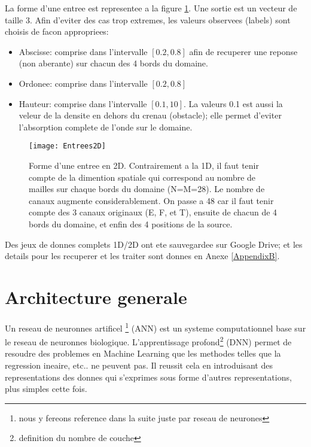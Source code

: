 La forme d'une entree est representee a la figure \ref{fig:Entrees2D}. Une sortie est un vecteur de taille 3. Afin d'eviter des cas trop extremes, les valeurs observees (labels) sont choisis de facon appropriees:
\begin{itemize}
 \item Abscisse: comprise dans l'intervalle $[0.2,0.8]$ afin de recuperer une reponse (non aberante) sur chacun des 4 bords du domaine.
 \item Ordonee: comprise dans l'intervalle $[0.2,0.8]$
 \item Hauteur: comprise dans l'intervalle $[0.1,10]$. La valeurs 0.1 est aussi la veleur de la densite en dehors du crenau (obstacle); elle permet d'eviter l'absorption complete de l'onde sur le domaine.
\end{itemize}

\begin{figure}[!h]
\centering
\texttt{[image: Entrees2D]} 
\decoRule
\caption[Entrees2D]{Forme d'une entree en 2D. Contrairement a la 1D, il faut tenir compte de la dimention spatiale qui correspond au nombre de mailles sur chaque bords du domaine (N=M=28). Le nombre de canaux augmente considerablement. On passe a 48 car il faut tenir compte des 3 canaux originaux (E, F, et T), ensuite de chacun de 4 bords du domaine, et enfin des 4 positions de la source.}
\label{fig:Entrees2D}
\end{figure}

Des jeux de donnes complets 1D/2D ont ete sauvegardee sur Google Drive; et les details pour les recuperer et les traiter sont donnes en Anexe \ref{AppendixB}.


\section{Architecture generale}

Un reseau de neuronnes artificel \footnote{nous y fereons reference dans la suite juste par reseau de neurones} (ANN) est un systeme computationnel base sur le reseau de neuronnes biologique. L'apprentissage profond\footnote{definition du nombre de couche} (DNN) permet de resoudre des problemes en Machine Learning que les methodes telles que la regression ineaire, etc.. ne peuvent pas. Il reussit cela en introduisant des representations des donnes qui s'exprimes sous forme d'autres representations, plus simples cette fois. 


